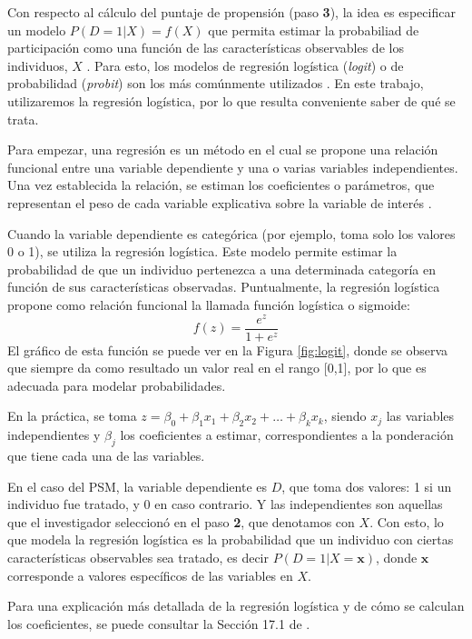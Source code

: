 \documentclass[../../main.tex]{subfiles}
\begin{document}
Con respecto al cálculo del puntaje de propensión (paso \textbf{3}), la idea es
especificar un modelo \(P(D=1|X) = f(X)\) que permita estimar la probabiliad de
participación como una función de las características observables de los individuos, \(X\)
\cite{bernal}. Para esto, los modelos de regresión logística (\textit{logit}) o de
probabilidad (\textit{probit}) son los más comúnmente utilizados \cite{bernal}. En este
trabajo, utilizaremos la regresión logística, por lo que resulta conveniente saber de qué
se trata.

Para empezar, una regresión es un método en el cual se propone una relación funcional
entre una variable dependiente y una o varias variables independientes. Una vez
establecida la relación, se estiman los coeficientes o parámetros, que representan el peso
de cada variable explicativa sobre la variable de interés \cite{giuliodori-2022}.

Cuando la variable dependiente es categórica (por ejemplo, toma solo los valores 0 o 1),
se utiliza la regresión logística. Este modelo permite estimar la probabilidad de que un
individuo pertenezca a una determinada categoría en función de sus características
observadas. Puntualmente, la regresión logística propone como relación funcional la
llamada función logística o sigmoide:
\[
    f(z) = \frac{e^z}{1 + e^z}
\]
El gráfico de esta función se puede ver en la Figura \ref{fig:logit}, donde se observa que
siempre da como resultado un valor real en el rango [0,1], por lo que es adecuada
para modelar probabilidades.

En la práctica, se toma \(z = \beta_0 + \beta_1 x_1 + \beta_2 x_2 + \dots +
\beta_k x_k\), siendo \(x_j\) las variables independientes y \(\beta_j\) los coeficientes
a estimar, correspondientes a la ponderación que tiene cada una de las variables.

En el caso del PSM, la variable dependiente es \(D\), que toma dos valores: 1 si un
individuo fue tratado, y 0 en caso contrario. Y las independientes son aquellas que el
investigador seleccionó en el paso \textbf{2}, que denotamos con \(X\). Con esto, lo que
modela la regresión logística es la probabilidad que un individuo con ciertas
características observables sea tratado, es decir \(P(D=1|X=\bm{x})\), donde \(\bm{x}\)
corresponde a valores específicos de las variables en \(X\).

Para una explicación más detallada de la regresión logística y de cómo se calculan los
coeficientes, se puede consultar la Sección 17.1 de \cite{intro-econometria-wooldridge}.
\end{document}
